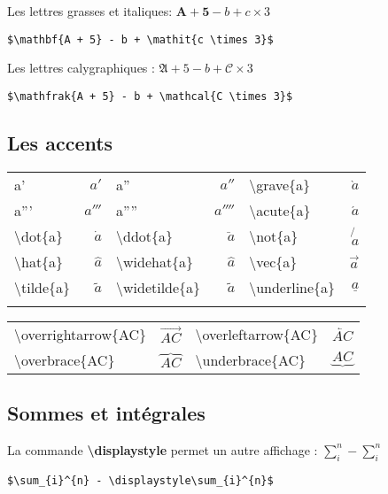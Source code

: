         Les lettres grasses et italiques: $\mathbf{A + 5} - b + \mathit{c \times 3}$
        \begin{lstlisting}
$\mathbf{A + 5} - b + \mathit{c \times 3}$
        \end{lstlisting}

        Les lettres calygraphiques : $\mathfrak{A + 5} - b + \mathcal{C \times 3}$
        \begin{lstlisting}
$\mathfrak{A + 5} - b + \mathcal{C \times 3}$
        \end{lstlisting}


    \subsection{Les accents}
        \begin{center}
            \begin{tabular}{l r | l r | l r }
                a' & $a'$ & a'' & $a''$ & \textbackslash grave\{a\} & $\grave{a}$ \\
                a''' & $a'''$ & a'''' & $a''''$ & \textbackslash acute\{a\} & $\acute{a}$ \\
                \textbackslash dot\{a\} & $\dot{a}$ & \textbackslash ddot\{a\} & $\ddot{a}$ & \textbackslash not\{a\} & $\not{a}$ \\
                \textbackslash hat\{a\} & $\hat{a}$ & \textbackslash widehat\{a\} & $\widehat{a}$ & \textbackslash vec\{a\} & $\vec{a}$ \\
                \textbackslash tilde\{a\} & $\tilde{a}$ & \textbackslash widetilde\{a\} & $\widetilde{a}$ & \textbackslash underline\{a\} & $\underline{a}$ \\\\
            \end{tabular}
            \begin{tabular}{l r | l r}
                \textbackslash overrightarrow\{AC\} & $\overrightarrow{AC}$ & \textbackslash overleftarrow\{AC\} & $\overleftarrow{AC}$ \\
                \textbackslash overbrace\{AC\} & $\overbrace{AC}$ & \textbackslash underbrace\{AC\} & $\underbrace{AC}$ \\
            \end{tabular}
        \end{center}




    \subsection{Sommes et intégrales}
        La commande \textbf{\textbackslash displaystyle} permet un autre affichage : $\sum_{i}^{n} - \displaystyle\sum_{i}^{n}$
        \begin{lstlisting}
$\sum_{i}^{n} - \displaystyle\sum_{i}^{n}$
        \end{lstlisting}

